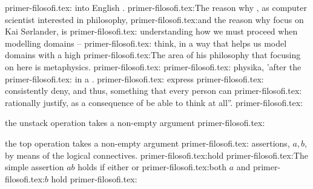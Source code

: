 {{{{{{{{{primer-filosofi.tex:      \cite{kaisorlander2022}  into English \cite{kaisorlander2023}.
primer-filosofi.tex:\pind The reason why , as computer scientist interested in philosophy,
primer-filosofi.tex:\pind and the reason why  focus on Kai S{\o}rlander, \nyl is
primer-filosofi.tex:      understanding \nyl {} how we must proceed when modelling domains --
primer-filosofi.tex:       think, in a way that helps us model domains \nyl with a high
primer-filosofi.tex:\pind The area of his philosophy that  focusing on here is metaphysics.
primer-filosofi.tex:
primer-filosofi.tex:  physika,  'after the 
primer-filosofi.tex:  in a .
primer-filosofi.tex:      express
primer-filosofi.tex:      consistently  deny, and thus, something that every person can
primer-filosofi.tex:      rationally justify, as a consequence of be able to think at all''.}
primer-filosofi.tex:\item \label{dum4} the \textsf{unstack} operation takes a\ysfchg{ } non-empty argument
primer-filosofi.tex:\item \label{dum5} the \textsf{top} operation  takes a\ysfchg{ } non-empty argument
primer-filosofi.tex:      assertions,  $a,b$, by means of the logical connectives.
primer-filosofi.tex:hold
primer-filosofi.tex:\pind The simple assertion $a$\VEE$b$ holds if either  or
primer-filosofi.tex:both   $a$ and
primer-filosofi.tex:$b$ hold
primer-filosofi.tex:}}}}}}}}
